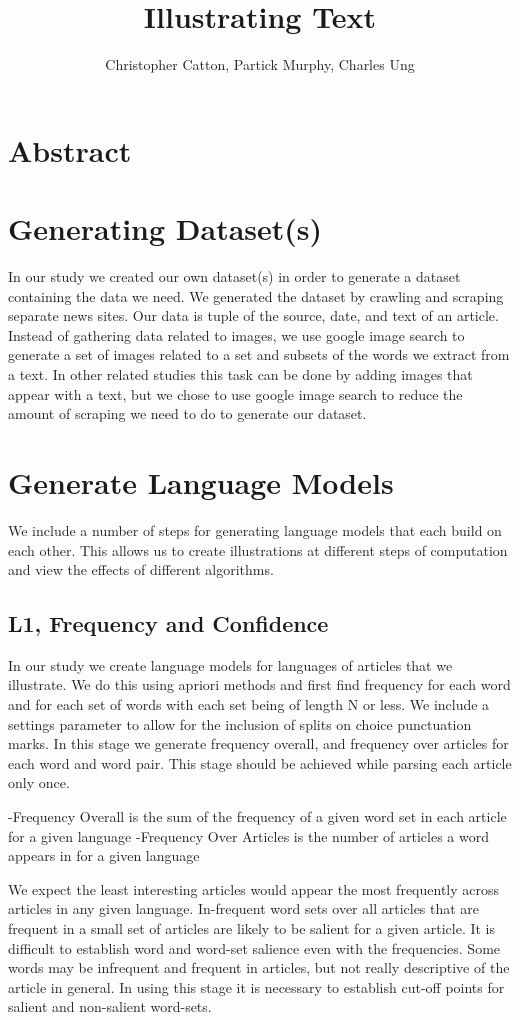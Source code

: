 \documentclass[12pt]{article}
\title{Illustrating Text}
\author{Christopher Catton, Partick Murphy, Charles Ung}
\begin{document}
\section{Abstract}
\section{Generating Dataset(s)}
In our study we created our own dataset(s) in order to generate a dataset containing the data we need. We generated the dataset by crawling and scraping separate news sites. Our data is tuple of the source, date, and text of an article.
Instead of gathering data related to images, we use google image search to generate a set of images related to a set and subsets of the words we extract from a text. In other related studies this task can be done by adding images that appear with a text, but we chose to use google image search to reduce the amount of scraping we need to do to generate our dataset.
\section{Generate Language Models}
We include a number of steps for generating language models that each build on each other. This allows us to create illustrations at different steps of computation and view the effects of different algorithms.
\subsection{L1, Frequency and Confidence}
In our study we create language models for languages of articles that we illustrate. We do this using apriori methods and first find frequency for each word and for each set of words with each set being of length N or less. We include a settings parameter to allow for the inclusion of splits on choice punctuation marks. In this stage we generate frequency overall, and frequency over articles for each word and word pair. This stage should be achieved while parsing each article only once.

-Frequency Overall is the sum of the frequency of a given word set in each article for a given language
-Frequency Over Articles is the number of articles a word appears in for a given language

We expect the least interesting articles would appear the most frequently across articles in any given language. In-frequent word sets over all articles that are frequent in a small set of articles are likely to be salient for a given article. It is difficult to establish word and word-set salience even with the frequencies. Some words may be infrequent and frequent in articles, but not really descriptive of the article in general. In using this stage it is necessary to establish
cut-off points for salient and non-salient word-sets.
\end{document}
